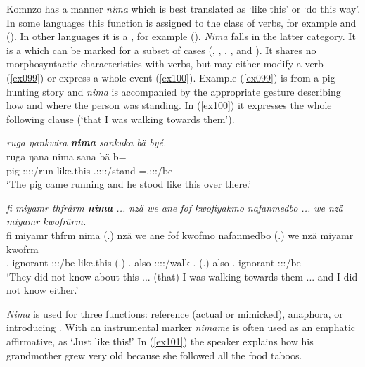 Komnzo has a manner  \emph{nima} which is best translated as `like this' or `do this way'. In some languages this function is assigned to the class of verbs, for example  and  (\citealt[72]{Dixon:2003dj}). In other languages it is a , for example  (\citealt[214]{Evans:1995uf}). \emph{Nima} falls in the latter category. It is a  which can be marked for a subset of cases (, , , , and ). It shares no morphosyntactic characteristics with verbs, but may either modify a verb (\ref{ex099}) or express a whole event (\ref{ex100}). Example (\ref{ex099}) is from a pig hunting story and \emph{nima} is accompanied by the appropriate gesture describing how and where the person was standing. In (\ref{ex100}) it expresses the whole following clause (`that I was walking towards them').

\begin{exe}
	\ex \emph{ruga ŋankwira \textbf{nima} sankuka bä byé.}\\
	\gll ruga ŋana nima sana bä b=\\
	pig \Stsg:\Sbj:\Pst:\Ipfv:\Venit/run {like.this} \Tsg{}.\Masc{}:\Sbj:\Pst:\Pfv:\Venit/stand \Med{} \Med{}=\Tsg{}.\Masc{}:\Sbj:\Nonpast:\Ipfv/be\\
	\trans `The pig came running and he stood like this over there.'\\ 
	\label{ex099}
\end{exe}
\begin{exe}
	\ex \emph{fi miyamr thfrärm \textbf{nima} ... nzä we ane fof kwofiyakmo nafanmedbo ... we nzä miyamr kwofrärm.}\\
	\gll fi miyamr thfrm nima (.) nzä we ane fof kwofmo nafanmedbo (.) we nzä miyamr kwofrm\\
	\Third{}.\Abs{} ignorant \Stpl:\Sbj:\Pst:\Dur/be {like.this} (.) \Fsg{}.\Abs{} also \Dem{} \Emph{} \Fsg:\Sbj:\Pst:\Dur:\Andat/walk \Third{}\Nsg{}.\All{} (.) also \Fsg{}.\Abs{} ignorant \Fsg:\Sbj:\Pst:\Dur/be\\
	\trans `They did not know about this ... (that) I was walking towards them ... and I did not know either.' 
	\label{ex100}
\end{exe}

\emph{Nima} is used for three functions:  reference (actual or mimicked), anaphora, or introducing . With an instrumental  marker \emph{nimame} is often used as an emphatic affirmative, as  `Just like this!' In (\ref{ex101}) the speaker explains how his grandmother grew very old because she followed all the food taboos.

